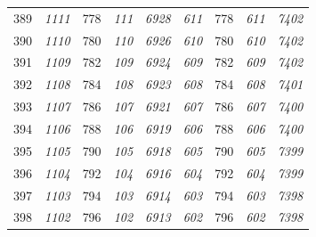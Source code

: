 \documentclass[10pt,fleqn]{article}
\begin{document}
\begin{longtable}{c|cccccccc}
389 & {\color{blue} \it 1111 \rm} & {\color{black} 778} & {\color{blue} \it 111 \rm} & {\color{blue} \it 6928 \rm} & {\color{blue} \it 611 \rm} & {\color{black} 778} & {\color{blue} \it 611 \rm} & {\color{blue} \it 7402 \rm} \\
390 & {\color{blue} \it 1110 \rm} & {\color{black} 780} & {\color{blue} \it 110 \rm} & {\color{blue} \it 6926 \rm} & {\color{blue} \it 610 \rm} & {\color{black} 780} & {\color{blue} \it 610 \rm} & {\color{blue} \it 7402 \rm} \\
391 & {\color{blue} \it 1109 \rm} & {\color{black} 782} & {\color{blue} \it 109 \rm} & {\color{blue} \it 6924 \rm} & {\color{blue} \it 609 \rm} & {\color{black} 782} & {\color{blue} \it 609 \rm} & {\color{blue} \it 7402 \rm} \\
392 & {\color{blue} \it 1108 \rm} & {\color{black} 784} & {\color{blue} \it 108 \rm} & {\color{blue} \it 6923 \rm} & {\color{blue} \it 608 \rm} & {\color{black} 784} & {\color{blue} \it 608 \rm} & {\color{blue} \it 7401 \rm} \\
393 & {\color{blue} \it 1107 \rm} & {\color{black} 786} & {\color{blue} \it 107 \rm} & {\color{blue} \it 6921 \rm} & {\color{blue} \it 607 \rm} & {\color{black} 786} & {\color{blue} \it 607 \rm} & {\color{blue} \it 7400 \rm} \\
394 & {\color{blue} \it 1106 \rm} & {\color{black} 788} & {\color{blue} \it 106 \rm} & {\color{blue} \it 6919 \rm} & {\color{blue} \it 606 \rm} & {\color{black} 788} & {\color{blue} \it 606 \rm} & {\color{blue} \it 7400 \rm} \\
395 & {\color{blue} \it 1105 \rm} & {\color{black} 790} & {\color{blue} \it 105 \rm} & {\color{blue} \it 6918 \rm} & {\color{blue} \it 605 \rm} & {\color{black} 790} & {\color{blue} \it 605 \rm} & {\color{blue} \it 7399 \rm} \\
396 & {\color{blue} \it 1104 \rm} & {\color{black} 792} & {\color{blue} \it 104 \rm} & {\color{blue} \it 6916 \rm} & {\color{blue} \it 604 \rm} & {\color{black} 792} & {\color{blue} \it 604 \rm} & {\color{blue} \it 7399 \rm} \\
397 & {\color{blue} \it 1103 \rm} & {\color{black} 794} & {\color{blue} \it 103 \rm} & {\color{blue} \it 6914 \rm} & {\color{blue} \it 603 \rm} & {\color{black} 794} & {\color{blue} \it 603 \rm} & {\color{blue} \it 7398 \rm} \\
398 & {\color{blue} \it 1102 \rm} & {\color{black} 796} & {\color{blue} \it 102 \rm} & {\color{blue} \it 6913 \rm} & {\color{blue} \it 602 \rm} & {\color{black} 796} & {\color{blue} \it 602 \rm} & {\color{blue} \it 7398 \rm} \\

\end{longtable}
\end{document}
